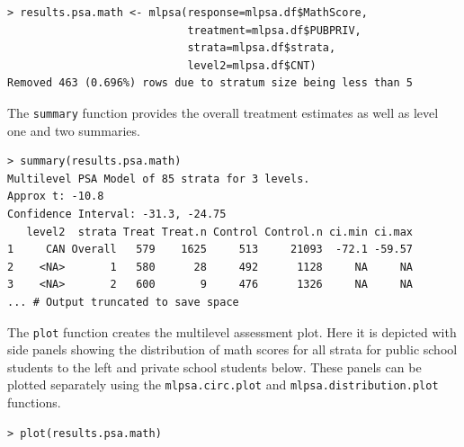 \documentclass[letterpaper,12pt]{article} %
\begin{document}
\begin{verbatim}
> results.psa.math <- mlpsa(response=mlpsa.df$MathScore, 
                            treatment=mlpsa.df$PUBPRIV, 
                            strata=mlpsa.df$strata, 
                            level2=mlpsa.df$CNT)
Removed 463 (0.696%) rows due to stratum size being less than 5
\end{verbatim}

\noindent The \texttt{summary} function provides the overall treatment estimates as well as level one and two summaries.

\begin{verbatim}
> summary(results.psa.math)
Multilevel PSA Model of 85 strata for 3 levels.
Approx t: -10.8
Confidence Interval: -31.3, -24.75
   level2  strata Treat Treat.n Control Control.n ci.min ci.max
1     CAN Overall   579    1625     513     21093  -72.1 -59.57
2    <NA>       1   580      28     492      1128     NA     NA
3    <NA>       2   600       9     476      1326     NA     NA
... # Output truncated to save space
\end{verbatim}

\noindent The \texttt{plot} function creates the multilevel assessment plot. Here it is depicted with side panels showing the distribution of math scores for all strata for public school students to the left and private school students below. These panels can be plotted separately using the \texttt{mlpsa.circ.plot} and \texttt{mlpsa.distribution.plot} functions.

\begin{verbatim}
> plot(results.psa.math)
\end{verbatim}
\end{document}
